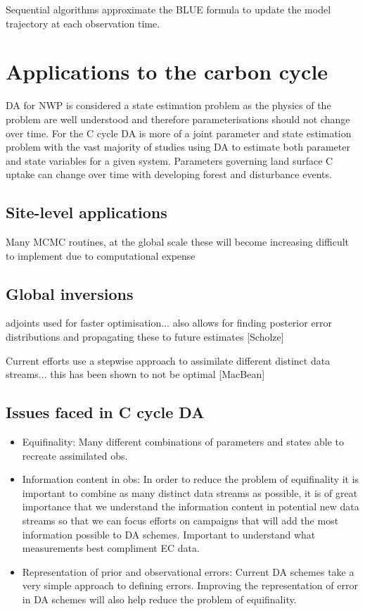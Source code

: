 \documentclass[12pt]{article}
\begin{document}
Sequential algorithms approximate the BLUE formula to update the model trajectory at each observation time. 

\section{Applications to the carbon cycle}

DA for NWP is considered a state estimation problem as the physics of the problem are well understood and therefore parameterisations should not change over time. For the C cycle DA is more of a joint parameter and state estimation problem with the vast majority of studies using DA to estimate both parameter and state variables for a given system. Parameters governing land surface C uptake can change over time with developing forest and disturbance events.  

\subsection{Site-level applications}

Many MCMC routines, at the global scale these will become increasing difficult to implement due to computational expense

\subsection{Global inversions}

adjoints used for faster optimisation... also allows for finding posterior error distributions and propagating these to future estimates [Scholze]

Current efforts use a stepwise approach to assimilate different distinct data streams... this has been shown to not be optimal [MacBean]

\subsection{Issues faced in C cycle DA}

\begin{itemize}
\item Equifinality: Many different combinations of parameters and states able to recreate assimilated obs.

\item Information content in obs: In order to reduce the problem of equifinality it is important to combine as many distinct data streams as possible, it is of great importance that we understand the information content in potential new data streams so that we can focus efforts on campaigns that will add the most information possible to DA schemes. Important to understand what measurements best compliment EC data.

\item Representation of prior and observational errors: Current DA schemes take a very simple approach to defining errors. Improving the representation of error in DA schemes will also help reduce the problem of equifinality.  
\end{itemize}
\end{document}
